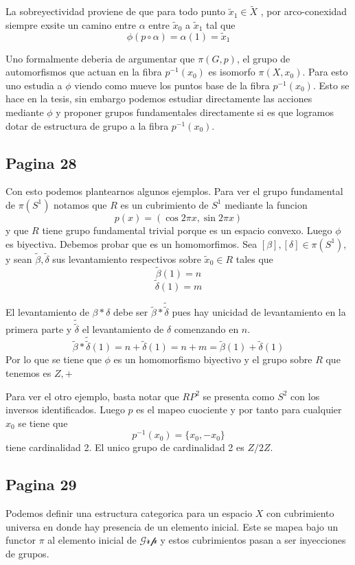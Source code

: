 \documentclass[letterpaper]{article}
\begin{document}
La sobreyectividad proviene de que para todo punto \(\tilde x_1 \in
\tilde X\) , por arco-conexidad siempre exsite un camino entre
\(\alpha\) entre \(\tilde x_0\) a \(\tilde x_1\) tal que
\[ \phi (p \circ \alpha) = \alpha (1) = \tilde x_1\]

Uno formalmente deberia de argumentar que \(\pi (G,p)\), el grupo de
automorfismos que actuan en la fibra \(p^{-1} (x_0)\) es isomorfo \(\pi
(X, x_0)\). Para esto uno estudia a \(\phi\) viendo como mueve los
puntos base de la fibra \(p^{-1} (x_0)\). Esto se hace en la tesis, sin
embargo podemos estudiar directamente las acciones mediante \(\phi\) y
proponer grupos fundamentales directamente si es que logramos dotar de
estructura de grupo a la fibra \(p^{-1} (x_0)\).

\subsection*{Pagina 28}
Con esto podemos plantearnos algunos ejemplos. Para ver el grupo
fundamental de \(\pi(S^1)\) notamos que \(R\) es un cubrimiento de \(S^1
\) mediante la funcion
\[ p (x) = (\cos 2 \pi x, \sin 2 \pi x) \]
y que \(R\) tiene grupo fundamental trivial porque es un espacio
convexo. Luego \(\phi\) es biyectiva. Debemos probar que es un
homomorfimos.
Sea \([\beta],[\delta] \in \pi (S^1)\), y sean \(\tilde
\beta , \tilde \delta\) sus levantamiento respectivos sobre \(\tilde x_0
\in R\) tales que
\[ \tilde \beta (1) = n \]
\[ \tilde \delta (1) = m \]

El levantamiento de \(\beta * \delta \) debe ser \(\tilde \beta
* \tilde {\tilde \delta}\) pues hay unicidad de levantamiento en la
primera parte y \(\tilde {\tilde \delta}\) el levantamiento de
\(\delta\) comenzando en \(n\).
\[ \tilde \beta * \tilde {\tilde \delta} (1) = n + \tilde \delta (1) =
  n + m = \tilde \beta (1) + \tilde \delta (1) \]
Por lo que se tiene que \(\phi \) es un homomorfismo biyectivo y el
grupo sobre \(R\) que tenemos es \(Z, +\)

Para ver el otro ejemplo, basta notar que \(RP^2\) se presenta como
\(S^2 \) con los inversos identificados. Luego \(p\) es el mapeo cuociente
y por tanto para cualquier \(x_0\) se tiene que
\[ p^{-1} (x_0) = \{x_0 , - x_0\}\]
tiene cardinalidad 2. El unico grupo de cardinalidad 2 es \(Z/2Z\).

\subsection*{Pagina 29}
Podemos definir una estructura categorica para un espacio \(X\) con
cubrimiento universa en donde hay presencia de un elemento inicial. Este
se mapea bajo un functor \(\pi\) al elemento inicial de
\(\mathscr{Grp}\) y estos cubrimientos pasan a ser inyecciones de grupos.
\end{document}
